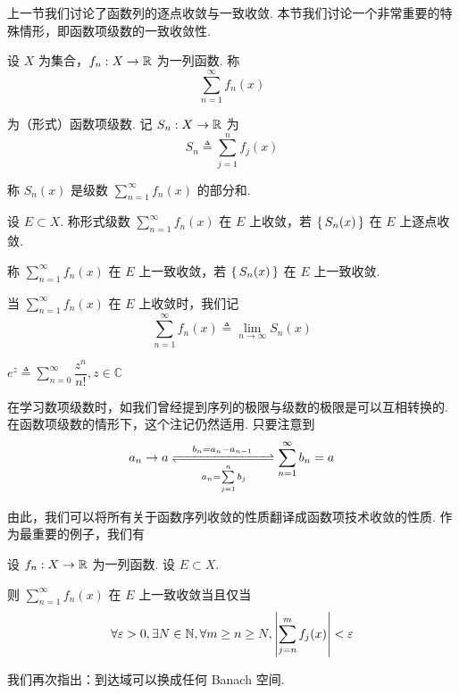 上一节我们讨论了函数列的逐点收敛与一致收敛. 本节我们讨论一个非常重要的特殊情形，即函数项级数的一致收敛性.


\begin{definition}
    设 $X$ 为集合，$f_n:X\to\mathbb{R}$ 为一列函数. 称
$$
\sum_{n=1}^\infty f_n(x)
$$

    为（形式）函数项级数. 记 $S_n:X\to\mathbb{R}$ 为
$$
S_n\triangleq\sum_{j=1}^nf_j(x)
$$

    称 $S_n(x)$ 是级数 $\sum\limits_{n=1}^\infty f_n(x)$ 的部分和.
\end{definition}

\begin{definition}
    设 $E\subset X$. 称形式级数 $\sum\limits_{n=1}^\infty f_n(x)$ 在 $E$ 上收敛，若 $\set{S_n(x)}$ 在 $E$ 上逐点收敛.

    称 $\sum\limits_{n=1}^\infty f_n(x)$ 在 $E$ 上一致收敛，若 $\set{S_n(x)}$ 在 $E$ 上一致收敛.

    当 $\sum\limits_{n=1}^\infty f_n(x)$ 在 $E$ 上收敛时，我们记
$$
\sum_{n=1}^\infty f_n(x)\triangleq\lim_{n\to\infty}S_n(x)
$$
\end{definition}

\begin{example}
    $e^z\triangleq\sum\limits_{n=0}^\infty\dfrac{z^n}{n!},z\in\mathbb{C}$
\end{example}

\begin{hint}
    在学习数项级数时，如我们曾经提到序列的极限与级数的极限是可以互相转换的. 在函数项级数的情形下，这个注记仍然适用. 只要注意到
$$
a_n\to a\xrightleftharpoons[\qquad a_n=\sum\limits_{j=1}^nb_j\qquad]{b_n=a_n-a_{n-1}}\sum_{n=1}^\infty b_n=a
$$

    由此，我们可以将所有关于函数序列收敛的性质翻译成函数项技术收敛的性质. 作为最重要的例子，我们有
\end{hint}

\begin{property}
    设 $f_n:X\to\mathbb{R}$ 为一列函数. 设 $E\subset X$.

    则 $\sum\limits_{n=1}^\infty f_n(x)$ 在 $E$ 上一致收敛当且仅当
$$
\forall\varepsilon>0,\exists N\in\mathbb{N},\forall m\ge n\ge N,\left\lvert{\sum_{j=n}^mf_j(x)}\right\rvert<\varepsilon
$$
\end{property}

\begin{hint}
    我们再次指出：到达域可以换成任何 Banach 空间.
\end{hint}

